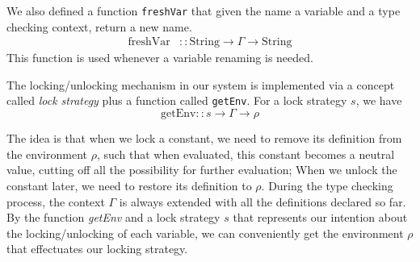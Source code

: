 \documentclass{article}
\theoremstyle{remark}
\begin{document}
We also defined a function \texttt{freshVar} that given the name a variable and a type checking context, return a new name.
\begin{align*}
  \text{freshVar} &:: \text{String} \to \Gamma \to \text{String}
\end{align*}
This function is used whenever a variable renaming is needed. 

The locking/unlocking mechanism in our system is implemented via a concept called \emph{lock strategy} plus a function called \texttt{getEnv}. For a lock strategy $s$, we have 
\[ \text{getEnv} :: s \to \Gamma \to \rho \]

The idea is that when we lock a constant, we need to remove its definition from the environment $\rho$, such that when evaluated, this constant becomes a neutral value, cutting off all the possibility for further evaluation; When we unlock the constant later, we need to restore its definition to $\rho$. During the type checking process, the context $\Gamma$ is always extended with all the definitions declared so far. By the function \emph{getEnv} and a lock strategy $s$ that represents our intention about the locking/unlocking of each variable, we can conveniently get the environment $\rho$ that effectuates our locking strategy.
\end{document}
